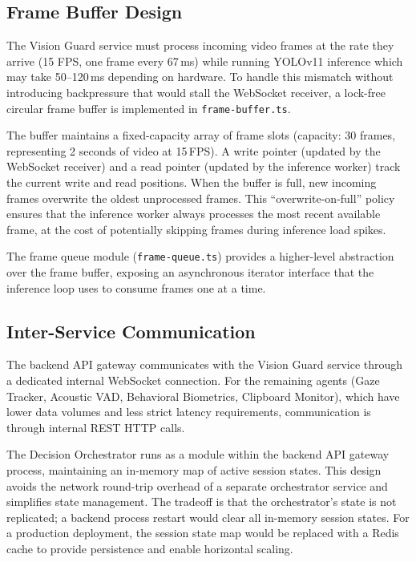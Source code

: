 \subsection{Frame Buffer Design}

The Vision Guard service must process incoming video frames at the rate they arrive (15 FPS, one frame every 67\,ms) while running YOLOv11 inference which may take 50--120\,ms depending on hardware. To handle this mismatch without introducing backpressure that would stall the WebSocket receiver, a lock-free circular frame buffer is implemented in \texttt{frame-buffer.ts}.

The buffer maintains a fixed-capacity array of frame slots (capacity: 30 frames, representing 2 seconds of video at 15\,FPS). A write pointer (updated by the WebSocket receiver) and a read pointer (updated by the inference worker) track the current write and read positions. When the buffer is full, new incoming frames overwrite the oldest unprocessed frames. This ``overwrite-on-full'' policy ensures that the inference worker always processes the most recent available frame, at the cost of potentially skipping frames during inference load spikes.

The frame queue module (\texttt{frame-queue.ts}) provides a higher-level abstraction over the frame buffer, exposing an asynchronous iterator interface that the inference loop uses to consume frames one at a time.

\subsection{Inter-Service Communication}

The backend API gateway communicates with the Vision Guard service through a dedicated internal WebSocket connection. For the remaining agents (Gaze Tracker, Acoustic VAD, Behavioral Biometrics, Clipboard Monitor), which have lower data volumes and less strict latency requirements, communication is through internal REST HTTP calls.

The Decision Orchestrator runs as a module within the backend API gateway process, maintaining an in-memory map of active session states. This design avoids the network round-trip overhead of a separate orchestrator service and simplifies state management. The tradeoff is that the orchestrator's state is not replicated; a backend process restart would clear all in-memory session states. For a production deployment, the session state map would be replaced with a Redis cache to provide persistence and enable horizontal scaling.

